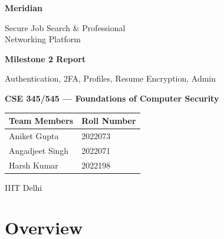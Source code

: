\documentclass[12pt, a4paper]{article}
\begin{document}
\begin{titlepage}
    \centering
    \vspace*{2cm}

    {\Huge\bfseries\textcolor{meridiandark}{Meridian}\par}
    \vspace{0.5cm}
    {\Large\textcolor{meridianblue}{Secure Job Search \& Professional\\Networking Platform}\par}

    \vspace{1.5cm}

    {\LARGE\textbf{Milestone 2 Report}\par}
    \vspace{0.3cm}
    {\large Authentication, 2FA, Profiles, Resume Encryption, Admin\par}

    \vspace{1.5cm}

    {\large\textbf{CSE 345/545 — Foundations of Computer Security}\par}

    \vspace{1.5cm}

    \begin{tabular}{ll}
        \toprule
        \textbf{Team Members} & \textbf{Roll Number} \\
        \midrule
        Aniket Gupta    & 2022073 \\
        Angadjeet Singh & 2022071 \\
        Harsh Kumar     & 2022198 \\
        \bottomrule
    \end{tabular}

    \vspace{2cm}

    {\large IIIT Delhi\par}
\end{titlepage}

\newpage
\tableofcontents
\newpage

\section{Overview}
\end{document}
